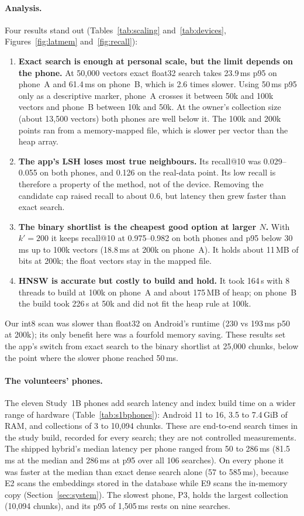 \documentclass[pdflatex,sn-basic,Numbered]{sn-jnl}
\begin{document}
\paragraph{Analysis.} Four results stand out (Tables~\ref{tab:scaling} and~\ref{tab:devices}, Figures~\ref{fig:latmem} and~\ref{fig:recall}):
\begin{enumerate}
  \item \textbf{Exact search is enough at personal scale, but the limit depends on the phone.} At 50,000 vectors exact float32 search takes 23.9\,ms p95 on phone~A and 61.4\,ms on phone~B, which is 2.6 times slower. Using 50\,ms p95 only as a descriptive marker, phone~A crosses it between 50k and 100k vectors and phone~B between 10k and 50k. At the owner's collection size (about 13,500 vectors) both phones are well below it. The 100k and 200k points ran from a memory-mapped file, which is slower per vector than the heap array.
  \item \textbf{The app's LSH loses most true neighbours.} Its recall@10 was 0.029--0.055 on both phones, and 0.126 on the real-data point. Its low recall is therefore a property of the method, not of the device. Removing the candidate cap raised recall to about 0.6, but latency then grew faster than exact search.
  \item \textbf{The binary shortlist is the cheapest good option at larger $N$.} With $k'=200$ it keeps recall@10 at 0.975--0.982 on both phones and p95 below 30\,ms up to 100k vectors (18.8\,ms at 200k on phone~A). It holds about 11\,MB of bits at 200k; the float vectors stay in the mapped file.
  \item \textbf{HNSW is accurate but costly to build and hold.} It took 164\,s with 8 threads to build at 100k on phone~A and about 175\,MB of heap; on phone~B the build took 226\,s at 50k and did not fit the heap rule at 100k.
\end{enumerate}
Our int8 scan was slower than float32 on Android's runtime (230 vs 193\,ms p50 at 200k); its only benefit here was a fourfold memory saving. These results set the app's switch from exact search to the binary shortlist at 25,000 chunks, below the point where the slower phone reached 50\,ms.

\paragraph{The volunteers' phones.} The eleven Study~1B phones add search latency and index build time on a wider range of hardware (Table~\ref{tab:s1bphones}): Android 11 to 16, 3.5 to 7.4\,GiB of RAM, and collections of 3 to 10,094 chunks. These are end-to-end search times in the study build, recorded for every search; they are not controlled measurements. The shipped hybrid's median latency per phone ranged from 50 to 286\,ms (81.5\,ms at the median and 286\,ms at p95 over all 106 searches). On every phone it was faster at the median than exact dense search alone (57 to 585\,ms), because E2 scans the embeddings stored in the database while E9 scans the in-memory copy (Section~\ref{sec:system}). The slowest phone, P3, holds the largest collection (10,094 chunks), and its p95 of 1,505\,ms rests on nine searches.
\end{document}
